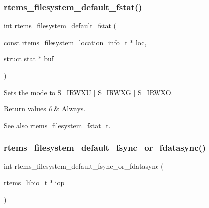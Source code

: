 \subsubsection{\texorpdfstring{rtems\_filesystem\_default\_fstat()}{rtems\_filesystem\_default\_fstat()}}
{\footnotesize\ttfamily int rtems\+\_\+filesystem\+\_\+default\+\_\+fstat (\begin{DoxyParamCaption}\item[{const \mbox{\hyperlink{group__LibIO_ga3252b3d31ee3c49ffff0b7604a676864}{rtems\+\_\+filesystem\+\_\+location\+\_\+info\+\_\+t}} $\ast$}]{loc,  }\item[{struct stat $\ast$}]{buf }\end{DoxyParamCaption})}



Sets the mode to S\+\_\+\+I\+R\+W\+XU $\vert$ S\+\_\+\+I\+R\+W\+XG $\vert$ S\+\_\+\+I\+R\+W\+XO. 


\begin{DoxyRetVals}{Return values}
{\em 0} & Always.\\
\hline
\end{DoxyRetVals}
\begin{DoxySeeAlso}{See also}
\mbox{\hyperlink{group__LibIOFSHandler_gabdbd09354c4e86c79735da3a1dc340a8}{rtems\+\_\+filesystem\+\_\+fstat\+\_\+t}}. 
\end{DoxySeeAlso}
\mbox{\label{group__LibIOFSHandler_ga7bcb245cbe4a71b0952beca086b63e1b}} 
\subsubsection{\texorpdfstring{rtems\_filesystem\_default\_fsync\_or\_fdatasync()}{rtems\_filesystem\_default\_fsync\_or\_fdatasync()}}
{\footnotesize\ttfamily int rtems\+\_\+filesystem\+\_\+default\+\_\+fsync\+\_\+or\+\_\+fdatasync (\begin{DoxyParamCaption}\item[{\mbox{\hyperlink{structrtems__libio__tt}{rtems\+\_\+libio\+\_\+t}} $\ast$}]{iop }\end{DoxyParamCaption})}


